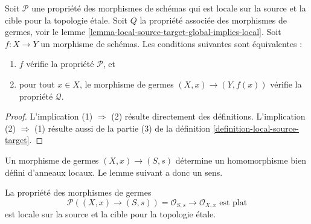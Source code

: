 \begin{lemma}
\label{lemma-local-source-target-local-implies-global}
Soit $\mathcal{P}$ une propriété des morphismes de schémas qui est
locale sur la source et la cible pour la topologie \'etale. Soit $Q$ la
propriété associée des morphismes de germes, voir le
lemme \ref{lemma-local-source-target-global-implies-local}.
Soit $f : X \to Y$ un morphisme de schémas. Les conditions suivantes
sont équivalentes :
\begin{enumerate}
\item $f$ vérifie la propriété $\mathcal{P}$, et
\item pour tout $x \in X$, le morphisme de germes
$(X, x) \to (Y, f(x))$ vérifie la propriété $\mathcal{Q}$.
\end{enumerate}
\end{lemma}

\begin{proof}
L'implication (1) $\Rightarrow$ (2) résulte directement des définitions.
L'implication (2) $\Rightarrow$ (1) résulte aussi de la partie (3) de la
définition \ref{definition-local-source-target}.
\end{proof}

\noindent
Un morphisme de germes $(X, x) \to (S, s)$ détermine un homomorphisme
bien défini d'anneaux locaux. Le lemme suivant a donc un sens.

\begin{lemma}
\label{lemma-flat-at-point}
La propriété des morphismes de germes
$$
\mathcal{P}((X, x) \to (S, s)) =
\mathcal{O}_{S, s} \to \mathcal{O}_{X, x}\text{ est plat}
$$
est locale sur la source et la cible pour la topologie \'etale.
\end{lemma}

